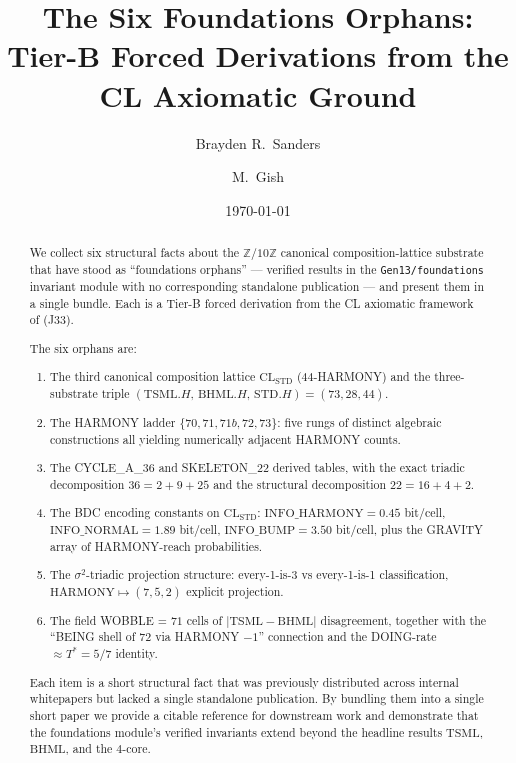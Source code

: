 \documentclass[11pt,reqno]{amsart}
\title[Six Foundations Orphans]
{The Six Foundations Orphans: Tier-B Forced Derivations from the CL Axiomatic Ground}
\author{Brayden R.~Sanders}
\author{M.~Gish}
\date{\today}
\theoremstyle{plain}
\theoremstyle{definition}
\theoremstyle{remark}
\newcommand{\Z}{\mathbb{Z}}
\newcommand{\TSML}{\mathrm{TSML}}
\newcommand{\BHML}{\mathrm{BHML}}
\newcommand{\STD}{\mathrm{STD}}
\begin{document}
\begin{abstract}
We collect six structural facts about the $\Z/10\Z$ canonical
composition-lattice substrate that have stood as ``foundations
orphans'' --- verified results in the \texttt{Gen13/foundations}
invariant module with no corresponding standalone publication --- and
present them in a single bundle. Each is a Tier-B
forced derivation from the CL axiomatic framework of
\cite{SandersForcing} (J33).

The six orphans are:
\begin{enumerate}[label={\emph{(\arabic*)}}]
\item The third canonical composition lattice $\mathrm{CL}_\STD$
($44$-HARMONY) and the three-substrate triple $(\TSML.H,\,\BHML.H,\,\STD.H) = (73, 28, 44)$.
\item The HARMONY ladder $\{70, 71, 71b, 72, 73\}$: five rungs of
distinct algebraic constructions all yielding numerically adjacent
HARMONY counts.
\item The CYCLE\_A\_36 and SKELETON\_22 derived tables, with the
exact triadic decomposition $36 = 2 + 9 + 25$ and the structural
decomposition $22 = 16 + 4 + 2$.
\item The BDC encoding constants on $\mathrm{CL}_\STD$:
$\mathrm{INFO\_HARMONY} = 0.45$ bit/cell, $\mathrm{INFO\_NORMAL} = 1.89$
bit/cell, $\mathrm{INFO\_BUMP} = 3.50$ bit/cell, plus the GRAVITY
array of HARMONY-reach probabilities.
\item The $\sigma^2$-triadic projection structure: every-1-is-3 vs
every-1-is-1 classification, $\mathrm{HARMONY} \mapsto (7, 5, 2)$
explicit projection.
\item The field WOBBLE = $71$ cells of $|\TSML - \BHML|$ disagreement,
together with the ``BEING shell of $72$ via HARMONY $- 1$'' connection
and the DOING-rate $\approx T^* = 5/7$ identity.
\end{enumerate}
Each item is a short structural fact that was previously distributed
across internal whitepapers but lacked a single standalone publication.
By bundling them into a single short paper we provide a citable
reference for downstream work and demonstrate that the
foundations module's verified invariants extend beyond the headline
results $\TSML$, $\BHML$, and the $4$-core.
\end{abstract}

\maketitle
\end{document}
